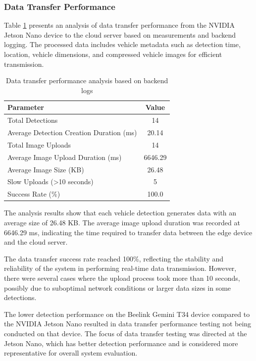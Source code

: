 \subsubsection{Data Transfer Performance}

Table \ref{tab:data_transfer} presents an analysis of data transfer performance from the NVIDIA Jetson Nano device to the cloud server based on measurements and backend logging. The processed data includes vehicle metadata such as detection time, location, vehicle dimensions, and compressed vehicle images for efficient transmission.

\begin{table}[htbp]
  \centering
  \begin{tabular}{|l|c|}
  \hline
  \rowcolor[HTML]{C0C0C0}
  \textbf{Parameter} & \textbf{Value} \\
  \hline
  Total Detections & 14 \\
  \hline
  Average Detection Creation Duration (ms) & 20.14 \\
  \hline
  Total Image Uploads & 14 \\
  \hline
  Average Image Upload Duration (ms) & 6646.29 \\
  \hline
  Average Image Size (KB) & 26.48 \\
  \hline
  Slow Uploads (\textgreater 10 seconds) & 5 \\
  \hline
  Success Rate (\%) & 100.0 \\
  \hline
  \end{tabular}
  \caption{Data transfer performance analysis based on backend logs}
  \label{tab:data_transfer}
\end{table}

The analysis results show that each vehicle detection generates data with an average size of 26.48 KB. The average image upload duration was recorded at 6646.29 ms, indicating the time required to transfer data between the edge device and the cloud server.

The data transfer success rate reached 100\%, reflecting the stability and reliability of the system in performing real-time data transmission. However, there were several cases where the upload process took more than 10 seconds, possibly due to suboptimal network conditions or larger data sizes in some detections.

The lower detection performance on the Beelink Gemini T34 device compared to the NVIDIA Jetson Nano resulted in data transfer performance testing not being conducted on that device. The focus of data transfer testing was directed at the Jetson Nano, which has better detection performance and is considered more representative for overall system evaluation.

